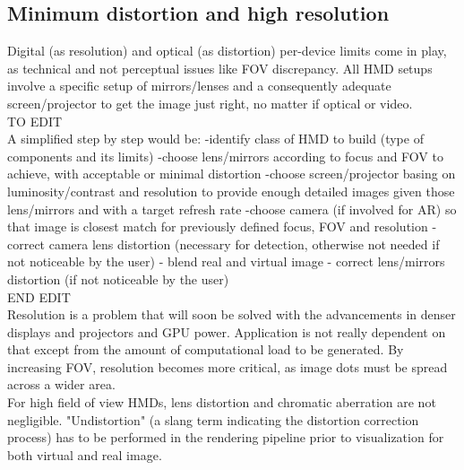 \subsection{Minimum distortion and high resolution}
Digital (as resolution) and optical (as distortion) per-device limits come in play, as technical and not perceptual issues like FOV discrepancy. All HMD setups involve a specific setup of mirrors/lenses and a consequently adequate screen/projector to get the image just right, no matter if optical or video.\\
TO EDIT\\
A simplified step by step would be:
-identify class of HMD to build (type of components and its limits)
-choose lens/mirrors according to focus and FOV to achieve, with acceptable or minimal distortion
-choose screen/projector basing on luminosity/contrast and resolution to provide enough detailed images given those lens/mirrors and with a target refresh rate
-choose camera (if involved for AR) so that image is closest match for previously defined focus, FOV and resolution
- correct camera lens distortion (necessary for detection, otherwise not needed if not noticeable by the user)
- blend real and virtual image
- correct lens/mirrors distortion (if not noticeable by the user)\\
END EDIT\\
Resolution is a problem that will soon be solved with the advancements in denser displays and projectors and GPU power. Application is not really dependent on that except from the amount of computational load to be generated. By increasing FOV, resolution becomes more critical, as image dots must be spread across a wider area.\\
For high field of view HMDs, lens distortion and chromatic aberration are not negligible. "Undistortion" (a slang term indicating the distortion correction process) has to be performed in the rendering pipeline prior to visualization for both virtual and real image.

